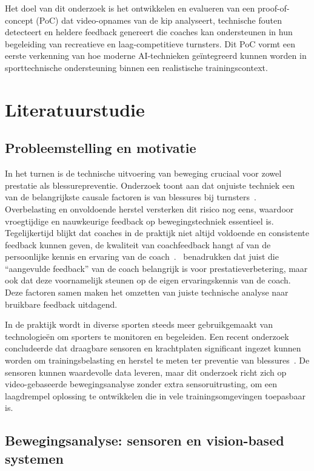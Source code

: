 Het doel van dit onderzoek is het ontwikkelen en evalueren van een proof-of-concept (PoC) dat video-opnames van de kip analyseert, technische fouten detecteert en heldere feedback genereert die coaches kan ondersteunen in hun begeleiding van recreatieve en laag-competitieve turnsters. Dit PoC vormt een eerste verkenning van hoe moderne AI-technieken geïntegreerd kunnen worden in sporttechnische ondersteuning binnen een realistische trainingscontext.

\section{Literatuurstudie}%
\label{sec:literatuurstudie}

\subsection{Probleemstelling en motivatie}

In het turnen is de technische uitvoering van beweging cruciaal voor zowel prestatie als blessurepreventie. Onderzoek toont aan dat onjuiste techniek een van de belangrijkste causale factoren is van blessures bij turnsters~\autocite{ijms262210929}. Overbelasting en onvoldoende herstel versterken dit risico nog eens, waardoor vroegtijdige en nauwkeurige feedback op bewegingstechniek essentieel is. Tegelijkertijd blijkt dat coaches in de praktijk niet altijd voldoende en consistente feedback kunnen geven, de kwaliteit van coachfeedback hangt af van de persoonlijke kennis en ervaring van de coach~\autocite{Jeraj2015}.~\textcite{Jeraj2015} benadrukken dat juist die ``aangevulde feedback'' van de coach belangrijk is voor prestatieverbetering, maar ook dat deze voornamelijk steunen op de eigen ervaringskennis van de coach. Deze factoren samen maken het omzetten van juiste technische analyse naar bruikbare feedback uitdagend.

In de praktijk wordt in diverse sporten steeds meer gebruikgemaakt van technologieën om sporters te monitoren en begeleiden. Een recent onderzoek concludeerde dat draagbare sensoren en krachtplaten significant ingezet kunnen worden om trainingsbelasting en herstel te meten ter preventie van blessures~\autocite{Rebelo2023}. De sensoren kunnen waardevolle data leveren, maar dit onderzoek richt zich op video-gebaseerde bewegingsanalyse zonder extra sensoruitrusting, om een laagdrempel oplossing te ontwikkelen die in vele trainingsomgevingen toepasbaar is.

\subsection{Bewegingsanalyse: sensoren en vision-based systemen}

